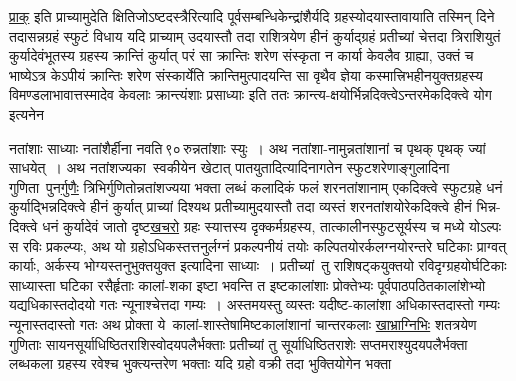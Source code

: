 \documentclass[11pt, openany]{book}
\begin{document}
\begin{sloppypar}
\hyperref[6.11.1]{प्राक्} इति प्राच्यामुदेति क्षितिजोऽष्टदस्त्रैरित्यादि पूर्वसम्बन्धिकेन्द्रांशैर्यदि ग्रहस्योदयास्तावायाति तस्मिन् दिने तदासन्नग्रहं स्फुटं विधाय यदि प्राच्याम् उदयास्तौ तदा राशित्रयेण हीनं कुर्याद्ग्रहं प्रतीच्यां चेत्तदा त्रिराशियुतं कुर्यादेवंभूतस्य ग्रहस्य क्रान्तिं कुर्यात् परं सा क्रान्तिः शरेण संस्कृता न कार्या केवलैव ग्राह्या, उक्तं च भाष्येऽत्र केऽपीयं क्रान्तिः शरेण संस्कार्येति क्रान्तिमुत्पादयन्ति सा वृथैव ज्ञेया कस्मात्त्रिभहीनयुक्तग्रहस्य विमण्डलाभावात्तस्मादेव केवलाः क्रान्त्यंशाः प्रसाध्याः इति ततः क्रान्त्य-क्षयोर्भिन्नदिक्त्वेऽन्तरमेकदिक्त्वे योग इत्यनेन
\end{sloppypar}

\newpage

\begin{sloppypar}
\noindent नतांशाः साध्याः नतांशैर्हीना नवति\textendash \,९०\textendash \,रुन्नतांशाः स्युः~। अथ नतांशा-नामुन्नतांशानां च पृथक् पृथक् ज्यां साधयेत्~। अथ नतांशज्यका~स्वकीयेन खेटात् पातयुतादित्यादिनागतेन स्फुटशरेणाङ्गुलादिना गुणिता~पुन\hyperref[6.11]{र्गुणैः} त्रिभिर्गुणितोन्नतांशज्यया भक्ता लब्धं कलादिकं फलं शरनतांशानाम् एकदिक्त्वे स्फुटग्रहे धनं कुर्याद्भिन्नदिक्त्वे हीनं कुर्यात् प्राच्यां दिश्यथ प्रतीच्यामुदयास्तौ तदा व्यस्तं शरनतांशयोरेकदिक्त्वे हीनं भिन्न-दिक्त्वे धनं कुर्यादेवं जातो दृष्ट\hyperref[6.12]{खचरो} ग्रहः स्यात्तस्य दृक्कर्मग्रहस्य, तात्कालीनस्फुटसूर्यस्य च मध्ये योऽल्पः स रविः प्रकल्प्यः, अथ यो ग्रहोऽधिकस्तत्तनुर्लग्नं प्रकल्पनीयं तयोः कल्पितयोरर्कलग्नयोरन्तरे घटिकाः प्राग्वत् कार्याः, अर्कस्य भोग्यस्तनुभुक्तयुक्त इत्यादिना साध्याः~। प्रतीच्यां~तु राशिषट्कयुक्तयो रविदृग्ग्रहयोर्घटिकाः साध्यास्ता घटिका रसैर्हृताः कालां-शका इष्टा भवन्ति त इष्टकालांशाः प्रोक्तेभ्यः पूर्वपाठपठितकालांशेभ्यो यद्यधिकास्तदोदयो गतः न्यूनाश्चेत्तदा गम्यः~। अस्तमयस्तु व्यस्तः यदीष्ट-कालांशा अधिकास्तदास्तो गम्यः न्यूनास्तदास्तो गतः अथ प्रोक्ता ये~कालां-शास्तेषामिष्टकालांशानां चान्तरकलाः \hyperref[6.13]{खाभ्राग्निभिः} शतत्रयेण गुणिताः सायनसूर्याधिष्ठितराशिस्वोदयपलैर्भक्ताः प्रतीच्यां तु सूर्याधिष्ठितराशेः सप्तमराश्युदयपलैर्भक्ता लब्धकला ग्रहस्य रवेश्च भुक्त्यन्तरेण भक्ताः यदि ग्रहो वक्री तदा भुक्तियोगेन भक्ता
\end{sloppypar}

\newpage
\end{document}
